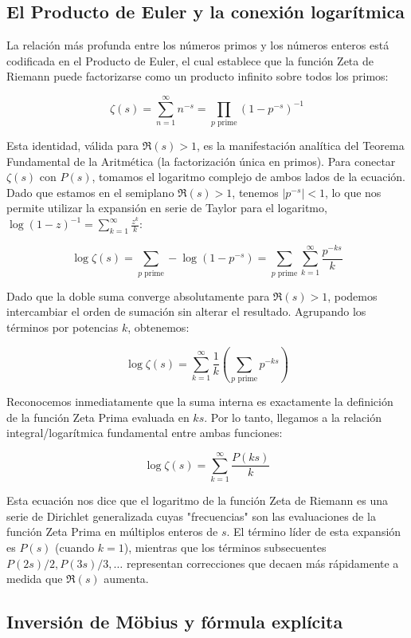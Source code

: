 \subsection{El Producto de Euler y la conexión logarítmica}

La relación más profunda entre los números primos y los números enteros está codificada en el Producto de Euler, el cual establece que la función Zeta de Riemann puede factorizarse como un producto infinito sobre todos los primos:

$$ \zeta(s) = \sum_{n=1}^{\infty} n^{-s} = \prod_{p \text{ prime}} \left(1 - p^{-s}\right)^{-1} $$

Esta identidad, válida para $\Re(s) > 1$, es la manifestación analítica del Teorema Fundamental de la Aritmética (la factorización única en primos). Para conectar $\zeta(s)$ con $P(s)$, tomamos el logaritmo complejo de ambos lados de la ecuación. Dado que estamos en el semiplano $\Re(s) > 1$, tenemos $|p^{-s}| < 1$, lo que nos permite utilizar la expansión en serie de Taylor para el logaritmo, $\log(1-z)^{-1} = \sum_{k=1}^{\infty} \frac{z^k}{k}$:

$$ \log \zeta(s) = \sum_{p \text{ prime}} -\log\left(1 - p^{-s}\right) = \sum_{p \text{ prime}} \sum_{k=1}^{\infty} \frac{p^{-ks}}{k} $$

Dado que la doble suma converge absolutamente para $\Re(s) > 1$, podemos intercambiar el orden de sumación sin alterar el resultado. Agrupando los términos por potencias $k$, obtenemos:

$$ \log \zeta(s) = \sum_{k=1}^{\infty} \frac{1}{k} \left( \sum_{p \text{ prime}} p^{-ks} \right) $$

Reconocemos inmediatamente que la suma interna es exactamente la definición de la función Zeta Prima evaluada en $ks$. Por lo tanto, llegamos a la relación integral/logarítmica fundamental entre ambas funciones:

$$ \log \zeta(s) = \sum_{k=1}^{\infty} \frac{P(ks)}{k} $$

Esta ecuación nos dice que el logaritmo de la función Zeta de Riemann es una serie de Dirichlet generalizada cuyas "frecuencias" son las evaluaciones de la función Zeta Prima en múltiplos enteros de $s$. El término líder de esta expansión es $P(s)$ (cuando $k=1$), mientras que los términos subsecuentes $P(2s)/2, P(3s)/3, \dots$ representan correcciones que decaen más rápidamente a medida que $\Re(s)$ aumenta.

\subsection{Inversión de Möbius y fórmula explícita}

